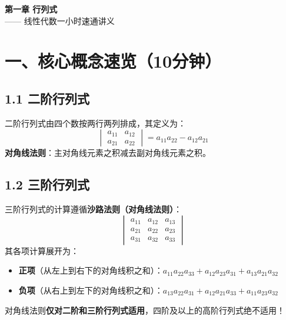 \documentclass{ctexart}
\begin{document}
\begin{center}
  \begin{tcolorbox}[
    colback=primary,
    colframe=primary,
    arc=6pt,
    halign=center,
    valign=center,
    top=15pt, bottom=15pt
  ]
    \color{white}
    {\huge\bfseries 第一章 行列式} \\[0.5em]
    {\large —— 线性代数一小时速通讲义}
  \end{tcolorbox}
\end{center}

\vspace{1em}

\section{一、核心概念速览（10分钟）}

\subsection{1.1 二阶行列式}
二阶行列式由四个数按两行两列排成，其定义为：
\[
\begin{vmatrix} a_{11} & a_{12} \\ a_{21} & a_{22} \end{vmatrix} = a_{11}a_{22} - a_{12}a_{21}
\]
\textbf{对角线法则}：主对角线元素之积减去副对角线元素之积。

\subsection{1.2 三阶行列式}
三阶行列式的计算遵循\textbf{沙路法则（对角线法则）}：
\[
\begin{vmatrix} a_{11} & a_{12} & a_{13} \\ a_{21} & a_{22} & a_{23} \\ a_{31} & a_{32} & a_{33} \end{vmatrix}
\]
其各项计算展开为：
\begin{itemize}
  \item \textbf{正项}（从左上到右下的对角线积之和）：$a_{11}a_{22}a_{33} + a_{12}a_{23}a_{31} + a_{13}a_{21}a_{32}$
  \item \textbf{负项}（从右上到左下的对角线积之和）：$a_{13}a_{22}a_{31} + a_{12}a_{21}a_{33} + a_{11}a_{23}a_{32}$
\end{itemize}

\begin{warningbox}
  对角线法则\textbf{仅对二阶和三阶行列式适用}，四阶及以上的高阶行列式绝不适用！
\end{warningbox}
\end{document}

